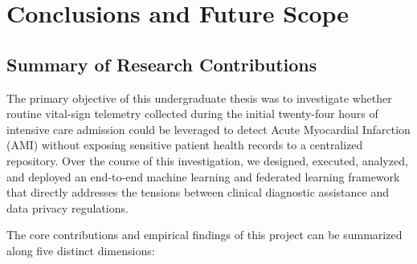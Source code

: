 \chapter{Conclusions and Future Scope}
\label{chap:conclusions}

\section{Summary of Research Contributions}
\label{sec:summary_contributions}

The primary objective of this undergraduate thesis was to investigate whether routine vital-sign telemetry collected during the initial twenty-four hours of intensive care admission could be leveraged to detect Acute Myocardial Infarction (AMI) without exposing sensitive patient health records to a centralized repository. Over the course of this investigation, we designed, executed, analyzed, and deployed an end-to-end machine learning and federated learning framework that directly addresses the tensions between clinical diagnostic assistance and data privacy regulations.

The core contributions and empirical findings of this project can be summarized along five distinct dimensions:

